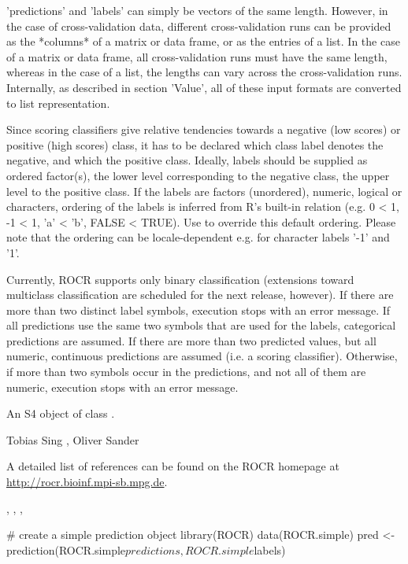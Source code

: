 \begin{Details}\relax
'predictions' and 'labels' can simply be vectors of the same
length. However, in the case of cross-validation data, different
cross-validation runs can be provided as the *columns* of a matrix or
data frame, or as the entries of a list. In the case of a matrix or
data frame, all cross-validation runs must have the same length, whereas
in the case of a list, the lengths can vary across the cross-validation
runs. Internally, as described in section 'Value', all of these input
formats are converted to list representation.

Since scoring classifiers give relative tendencies towards a negative
(low scores) or positive (high scores) class, it has to be declared
which class label denotes the negative, and which the positive class.
Ideally, labels should be supplied as ordered factor(s), the lower
level corresponding to the negative class, the upper level to the
positive class. If the labels are factors (unordered), numeric,
logical or characters, ordering of the labels is inferred from
R's built-in \code{<} relation (e.g. 0 \textless{} 1, -1 \textless{} 1, 'a' \textless{} 'b',
FALSE \textless{} TRUE). Use  to override this default
ordering. Please note that the ordering can be locale-dependent
e.g. for character labels '-1' and '1'.

Currently, ROCR supports only binary classification (extensions toward
multiclass classification are scheduled for the next release,
however). If there are more than two distinct label symbols, execution
stops with an error message. If all predictions use the same two
symbols that are used for the labels, categorical predictions are
assumed. If there are more than two predicted values, but all numeric,
continuous predictions are assumed (i.e. a scoring
classifier). Otherwise, if more than two symbols occur in the
predictions, and not all of them are numeric, execution stops with an
error message.
\end{Details}
\begin{Value}
An S4 object of class .
\end{Value}
\begin{Author}\relax
Tobias Sing ,
Oliver Sander 
\end{Author}
\begin{References}\relax
A detailed list of references can be found on the ROCR
homepage at \url{http://rocr.bioinf.mpi-sb.mpg.de}.
\end{References}
\begin{SeeAlso}\relax
{}, ,
, 
\end{SeeAlso}
\begin{Examples}
\begin{ExampleCode}
# create a simple prediction object
library(ROCR)
data(ROCR.simple)
pred <- prediction(ROCR.simple$predictions,ROCR.simple$labels)
\end{ExampleCode}
\end{Examples}

